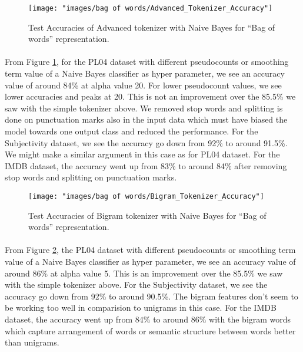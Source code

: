 \documentclass[a4paper,26pt]{article}
\begin{document}
\begin{figure}[H]
\centerline{\texttt{[image: "images/bag of words/Advanced\_Tokenizer\_Accuracy"]}}
\caption{Test Accuracies of Advanced tokenizer with Naive Bayes for ``Bag of words'' representation.}
\label{fig:advancedtok}
\end{figure}

\paragraph{}
From Figure \ref{fig:advancedtok}, for the PL04 dataset with different pseudocounts or smoothing term value of a Naive Bayes classifier as hyper parameter, we see an accuracy value of around 84\% at alpha value 20. For lower pseudocount values, we see lower accuracies and peaks at 20. This is not an improvement over the 85.5\% we saw with the simple tokenizer above. We removed stop words and splitting is done on punctuation marks also in the input data which must have biased the model towards one output class and reduced the performance. For the Subjectivity dataset, we see the accuracy go down from  92\% to around 91.5\%. We might make a similar argument in this case as for PL04 dataset. For the IMDB dataset, the accuracy went up from 83\% to around 84\% after removing stop words and splitting on punctuation marks. 

\begin{figure}[H]
\centerline{\texttt{[image: "images/bag of words/Bigram\_Tokenizer\_Accuracy"]}}
\caption{Test Accuracies of Bigram tokenizer with Naive Bayes for ``Bag of words'' representation.}
\label{fig:bigramtok}
\end{figure}

\paragraph{}
From Figure \ref{fig:bigramtok}, the PL04 dataset with different pseudocounts or smoothing term value of a Naive Bayes classifier as hyper parameter, we see an accuracy value of around 86\% at alpha value 5. This is an improvement over the 85.5\% we saw with the simple tokenizer above. For the Subjectivity dataset, we see the accuracy go down from  92\% to around 90.5\%. The bigram features don't seem to be working too well in comparision to unigrams in this case. For the IMDB dataset, the accuracy went up from $84\%$ to around $86\%$ with the bigram words which capture arrangement of words or semantic structure between words better than unigrams.
\end{document}
